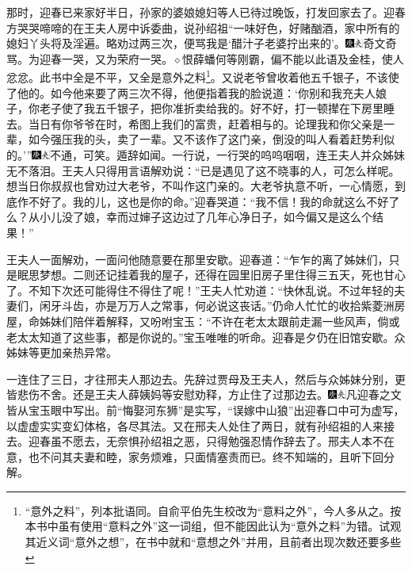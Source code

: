 那时，迎春已来家好半日，孙家的婆娘媳妇等人已待过晚饭，打发回家去了。迎春方哭哭啼啼的在王夫人房中诉委曲，说孙绍祖“一味好色，好赌酗酒，家中所有的媳妇丫头将及淫遍。略劝过两三次，便骂我是‘醋汁子老婆拧出来的’。{\includegraphics[width=3mm]{../Images/00004}\includegraphics[width=3mm]{../Images/00012}\footnotesize \kaishu 奇文奇骂。为迎春一哭，又为荣府一哭。{$\diamond$}恨薛蟠何等刚霸，偏不能以此语及金桂，使人忿忿。此书中全是不平，又全是意外之料\footnote{“意外之料”，列本批语同。自俞平伯先生校改为“意料之外”，今人多从之。按本书中虽有使用“意料之外”这一词组，但不能因此认为“意外之料”为错。试观其近义词“意外之想”，在书中就和“意想之外”并用，且前者出现次数还要多些}。}又说老爷曾收着他五千银子，不该使了他的。如今他来要了两三次不得，他便指着我的脸说道：‘你别和我充夫人娘子，你老子使了我五千银子，把你准折卖给我的。好不好，打一顿撵在下房里睡去。当日有你爷爷在时，希图上我们的富贵，赶着相与的。论理我和你父亲是一辈，如今强压我的头，卖了一辈。又不该作了这门亲，倒没的叫人看着赶势利似的。’”{\includegraphics[width=3mm]{../Images/00004}\includegraphics[width=3mm]{../Images/00012}\footnotesize \kaishu 不通，可笑。遁辞如闻。}一行说，一行哭的呜呜咽咽，连王夫人并众姊妹无不落泪。王夫人只得用言语解劝说：“已是遇见了这不晓事的人，可怎么样呢。想当日你叔叔也曾劝过大老爷，不叫作这门亲的。大老爷执意不听，一心情愿，到底作不好了。我的儿，这也是你的命。”迎春哭道：“我不信！我的命就这么不好了么？从小儿没了娘，幸而过婶子这边过了几年心净日子，如今偏又是这么个结果！”

王夫人一面解劝，一面问他随意要在那里安歇。迎春道：“乍乍的离了姊妹们，只是眠思梦想。二则还记挂着我的屋子，还得在园里旧房子里住得三五天，死也甘心了。不知下次还可能得住不得住了呢！”王夫人忙劝道：“快休乱说。不过年轻的夫妻们，闲牙斗齿，亦是万万人之常事，何必说这丧话。”仍命人忙忙的收拾紫菱洲房屋，命姊妹们陪伴着解释，又吩咐宝玉：“不许在老太太跟前走漏一些风声，倘或老太太知道了这些事，都是你说的。”宝玉唯唯的听命。迎春是夕仍在旧馆安歇。众姊妹等更加亲热异常。

一连住了三日，才往邢夫人那边去。先辞过贾母及王夫人，然后与众姊妹分别，更皆悲伤不舍。还是王夫人薛姨妈等安慰劝释，方止住了过那边去。{\includegraphics[width=3mm]{../Images/00004}\includegraphics[width=3mm]{../Images/00012}\footnotesize \kaishu 凡迎春之文皆从宝玉眼中写出。前“悔娶河东狮”是实写，“误嫁中山狼”出迎春口中可为虚写，以虚虚实实变幻体格，各尽其法。}又在邢夫人处住了两日，就有孙绍祖的人来接去。迎春虽不愿去，无奈惧孙绍祖之恶，只得勉强忍情作辞去了。邢夫人本不在意，也不问其夫妻和睦，家务烦难，只面情塞责而已。终不知端的，且听下回分解。


